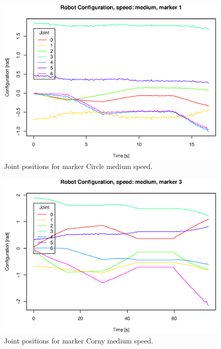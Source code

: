 \begin{figure}[H]\centering\includegraphics[width=\fullImageWidth]{graphics/rovi_robot_configuration_medium_marker1.eps}\caption{Joint positions for marker Circle medium speed.}     \label{fig:rovi_joint_pos_M_Circle}   \end{figure}
\begin{figure}[H]\centering\includegraphics[width=\fullImageWidth]{graphics/rovi_robot_configuration_medium_marker3.eps}\caption{Joint positions for marker Corny  medium speed.}     \label{fig:rovi_joint_pos_M_Corny }   \end{figure}
